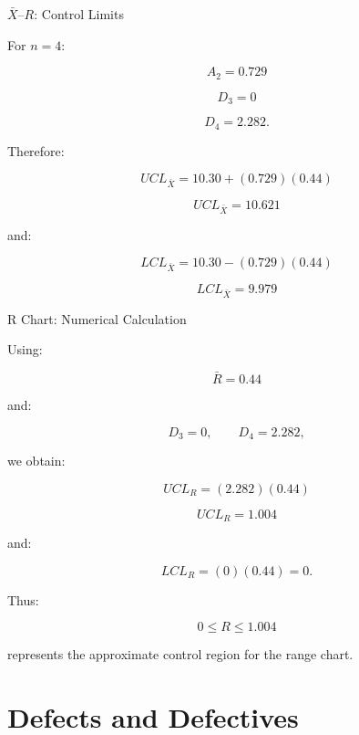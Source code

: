 \documentclass[aspectratio=169,10pt]{beamer}
\begin{document}

\begin{frame}[shrink=18]{$\bar X$--$R$: Control Limits}
\small

For \(n=4\):

\[
A_2=0.729
\]

\[
D_3=0
\]

\[
D_4=2.282.
\]

Therefore:

\[
UCL_{\bar X}
=
10.30+(0.729)(0.44)
\]

\[
\boxed{
UCL_{\bar X}=10.621
}
\]

and:

\[
LCL_{\bar X}
=
10.30-(0.729)(0.44)
\]

\[
\boxed{
LCL_{\bar X}=9.979
}
\]

\end{frame}


\begin{frame}[shrink=18]{R Chart: Numerical Calculation}
\small

Using:

\[
\bar R=0.44
\]

and:

\[
D_3=0,\qquad D_4=2.282,
\]

we obtain:

\[
UCL_R=(2.282)(0.44)
\]

\[
\boxed{
UCL_R=1.004
}
\]

and:

\[
LCL_R=(0)(0.44)=0.
\]

Thus:

\[
\boxed{
0\le R\le1.004
}
\]

represents the approximate control region for the range chart.

\end{frame}


\section{Defects and Defectives}
\end{document}
